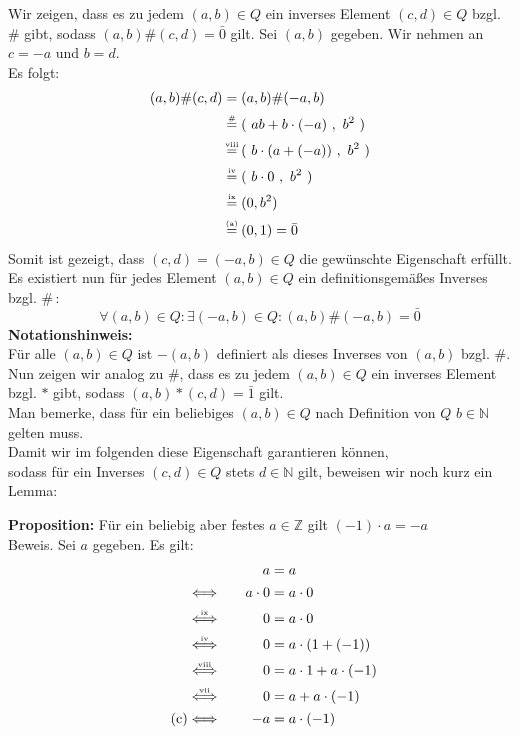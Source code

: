 \documentclass[a4paper,graphics,12pt]{article}
\newcommand{\up}[2]{\mathrel{\overset{\makebox[0pt]{\mbox{\normalfont\tiny #2}}}{#1}}}
\newcommand{\pair}[2]{(\ #1\ ,\ #2\ )}
\begin{document}
Wir zeigen, dass es zu jedem $(a,b) \in Q$ ein inverses Element $(c,d) \in Q$ bzgl. \# gibt,
sodass $(a,b) \# (c,d) = \bar{0}$ gilt. Sei $(a,b)$ gegeben. Wir nehmen an $c=-a$ und $b=d$.\\Es folgt:
\begin{align*}
    (a,b) \# (c,d) &\up{=}{} (a,b) \# (-a,b) \\[1pt]
    &\up{=}{\#} \pair{ab + b\cdot (-a)}{b^2} \\[1pt]
    &\up{=}{viii} \pair{b\cdot(a + (-a))}{b^2} \\[1pt]
    &\up{=}{iv} \pair{b\cdot 0}{b^2} \\[1pt]
    &\up{=}{ix} (0,b^2) \\[1pt]
    &\up{=}{(a)} (0,1) = \bar{0}
\end{align*}
Somit ist gezeigt, dass $(c,d) = (-a, b) \in Q$ die gewünschte Eigenschaft erfüllt.\\
Es existiert nun für jedes Element $(a,b) \in Q$ ein definitionsgemäßes Inverses bzgl. \#\,:
$$
\forall (a,b) \in Q\colon \exists (-a,b) \in Q \colon (a,b) \# (-a,b) = \bar{0}
$$
\textbf{Notationshinweis:}\\
Für alle $(a,b) \in Q$ ist $-(a,b)$ definiert als dieses Inverses von $(a,b)$ bzgl. \#.\\

Nun zeigen wir analog zu $\#$, dass es zu jedem $(a,b) \in Q$ ein inverses Element bzgl. $*$ gibt,
sodass $(a,b) * (c,d) = \bar{1}$ gilt.\\
Man bemerke, dass für ein beliebiges $(a,b) \in Q$ nach Definition von $Q$
$b \in \mathbb{N}$ gelten muss. \\
Damit wir im folgenden diese Eigenschaft garantieren können,\\
sodass für ein Inverses $(c,d) \in Q$ stets $d \in \mathbb{N}$ gilt,
beweisen wir noch kurz ein Lemma:

\newpage

\textbf{Proposition:} Für ein beliebig aber festes $a \in \mathbb{Z}$ gilt $(-1)\cdot a = -a$\\
Beweis. Sei $a$ gegeben. Es gilt:
\begin{alignat*}{3}
    &                               & a &= a\\[1pt]
    &\up{\Longleftrightarrow}{}\quad    & a\cdot 0 &= a\cdot 0\\[1pt]
    &\up{\Longleftrightarrow}{ix}       & 0 &= a\cdot 0 \\[1pt]
    &\up{\Longleftrightarrow}{iv}       & 0 &= a\cdot (1+(-1)) \\[1pt]
    &\up{\Longleftrightarrow}{viii}     & 0 &= a\cdot 1+a\cdot (-1) \\[1pt]
    &\up{\Longleftrightarrow}{vii}      & 0 &= a+a\cdot (-1) \\[1pt]
    \tag{c}
    &\up{\Longleftrightarrow}{}         & -a &= a\cdot (-1)
\end{alignat*}
\end{document}
